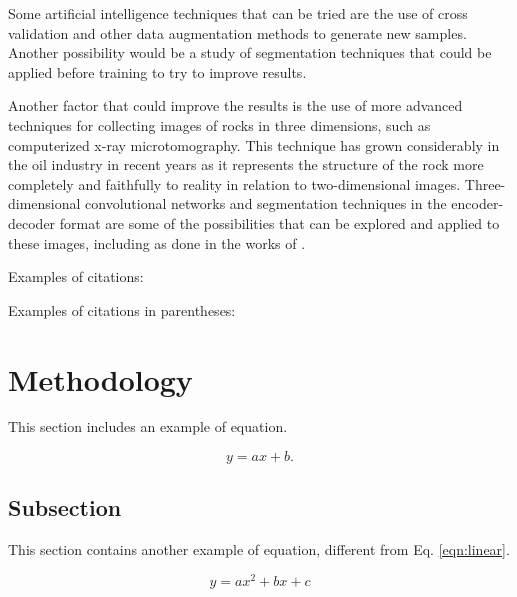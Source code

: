 \documentclass[a4paper,fleqn]{cas-sc}
\begin{document}
Some artificial intelligence techniques that can be tried are the use of cross validation and other data augmentation methods to generate new samples. Another possibility would be a study of segmentation techniques that could be applied before training to try to improve results.

Another factor that could improve the results is the use of more advanced techniques for collecting images of rocks in three dimensions, such as computerized x-ray microtomography. This technique has grown considerably in the oil industry in recent years \cite{Blunt2013, Andra2013a, Berg2017} as it represents the structure of the rock more completely and faithfully to reality in relation to two-dimensional images. Three-dimensional convolutional networks and segmentation techniques in the encoder-decoder format are some of the possibilities that can be explored and applied to these images, including as done in the works of .









Examples of citations:

\cite{gomez1990isim3d, pebesma2004multivariable, hansen2018multiple}

Examples of citations in parentheses: 

\citep{gomez1990isim3d, pebesma2004multivariable, hansen2018multiple}

\section{Methodology}

This section includes an example of equation. 
 
\begin{equation}
\label{eqn:linear}
    y=ax+b.
\end{equation}


\subsection{Subsection}

This section contains another example of equation, different from Eq.  \ref{eqn:linear}.

\begin{equation} 
\label{eqn:quadratic}
    y=ax^2+bx+c
\end{equation}
\end{document}

